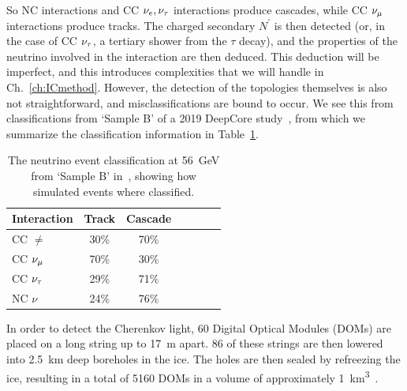 So NC interactions and CC $\nu_e, \nu_\tau$ interactions produce cascades, while CC $\nu_\mu$ interactions produce tracks. 
The charged secondary $N^\prime$ is then detected (or, in the case of CC $\nu_\tau$, a tertiary shower from the $\tau$ decay), and the properties of the neutrino involved in the 
interaction are then deduced. This deduction will be imperfect, and this introduces complexities that we will handle in Ch.~\ref{ch:ICmethod}. 
However, the detection of the topologies themselves is also not straightforward, and misclassifications are bound to occur.
We see this from classifications from `Sample B' of a 2019 DeepCore study~\cite{DC2019tauappearance}, from which we summarize the classification 
information in Table~\ref{table:events}.

\begin{table}[h]
    \begin{center}
        \begin{tabular}{lcccccc}
            \hline \hline
            Interaction &Track &Cascade\\
            \hline
            CC $\ne$ & 30\%& 70\% \\
            CC $\nu_\mu$ & 70\%&30\% \\
            CC $\nu_\tau$ & 29\%& 71\%\\
            NC $\nu$ & 24\%& 76\%\\
            \hline \hline
        \end{tabular}
    \end{center}
    \caption{The neutrino event classification at \SI{56}{\GeV} from `Sample B' in~\cite{DC2019tauappearance}, showing 
    how simulated events where classified.}\label{table:events}
\end{table}


In order to detect the Cherenkov light, 60 Digital Optical Modules (DOMs) are placed on a long string up to \SI{17}{\metre} apart. 86 of these strings are then lowered
into \SI{2.5}{\km} deep boreholes in the ice. The holes are then sealed by refreezing the ice, resulting in a total of 5160 DOMs in a volume of approximately \SI{1}{\km^3}~\cite{weaverThesis}.

